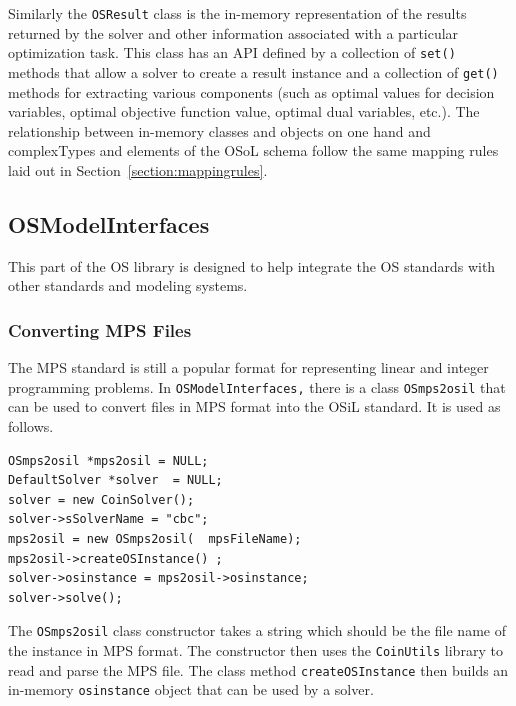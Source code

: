 \documentclass[11pt]{article}
\renewcommand{\_}{{\char"5F}}
\renewcommand{\{}{{\char"7B}}
\renewcommand{\}}{{\char"7D}}
\renewcommand{\^}{{\char"0D}}
\renewcommand{\'}{{\char"0D}}
\begin{document}
\begin{enumerate}[Step 1:]
Similarly the {\tt OSResult} class is the in-memory representation of the 
results returned by the solver and other information associated with a particular optimization task. 
This class has an API defined by a collection of {\tt set()} methods that allow a solver to create a result instance
and a collection of {\tt get()} methods for
extracting various components (such as optimal values for decision variables, optimal objective function value, 
optimal dual variables, etc.). The relationship between
in-memory classes and objects on one hand and complexTypes and elements of the OSoL schema follow the same 
mapping rules laid out in Section~\ref{section:mappingrules}.



\subsection{OSModelInterfaces}\label{section:osmodelinterfaces}

This part of the OS library is designed to help integrate the OS standards with other standards and modeling systems.

\subsubsection{Converting MPS Files}

The MPS standard is still a popular format for representing linear and integer programming problems.
In {\tt OSModelInterfaces,} there is a class {\tt OSmps2osil} that can be used
to convert files in MPS format into the OSiL standard. It is used as follows.

\begin{verbatim}
OSmps2osil *mps2osil = NULL;
DefaultSolver *solver  = NULL;
solver = new CoinSolver();
solver->sSolverName = "cbc";
mps2osil = new OSmps2osil(  mpsFileName);
mps2osil->createOSInstance() ;
solver->osinstance = mps2osil->osinstance;
solver->solve();
\end{verbatim}

The {\tt OSmps2osil} class constructor takes a string which should be the
file name of the instance in MPS format. The constructor then uses the
{\tt CoinUtils} library to read and parse the MPS file.  The class method {\tt createOSInstance} then builds  an in-memory {\tt osinstance} object  that can be used by a solver.


\end{enumerate}
\end{document}
